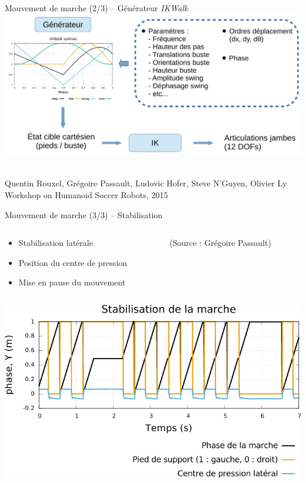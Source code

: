 \begin{frame}[noframenumbering]{Mouvement de marche (2/3) -- Générateur \textit{IKWalk}}
    \centering
    \includegraphics[type=pdf,ext=.pdf,read=.pdf,width=1.0\linewidth]{../schema/ikwalk}
    \begin{block}{}
        \\
        \scriptsize
        Quentin Rouxel, Grégoire Passault, Ludovic Hofer, Steve N'Guyen, Olivier Ly\\
        Workshop on Humanoid Soccer Robots, 2015\\
    \end{block}
\end{frame}

\begin{frame}[noframenumbering]{Mouvement de marche (3/3) -- Stabilisation}
    \begin{columns}
        \begin{column}{0.5\textwidth}
            \begin{itemize}
                \item Stabilisation latérale
                \item Position du centre de pression
                \item Mise en pause du mouvement
            \end{itemize}
        \end{column}
        \begin{column}{0.5\textwidth}
            \centering
            \scriptsize
            (Source : Grégoire Passault)
        \end{column}
    \end{columns}
    \centering
    \includegraphics[type=pdf,ext=.pdf,read=.pdf,width=0.6\linewidth]{../plot/walk_stabilization1}
\end{frame}
